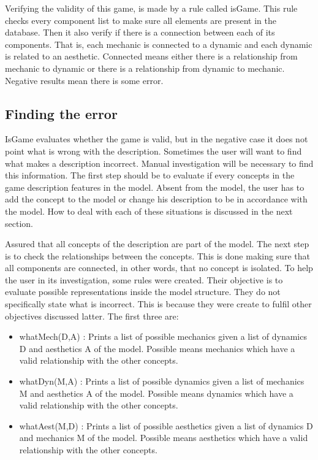 Verifying the validity of this game, is made by a rule called isGame. This rule checks every component list to make sure all elements are present in the database. Then it also verify if there is a connection between each of its components. That is, each mechanic is connected to a dynamic and each dynamic is related to an aesthetic. Connected means either there is a relationship from mechanic to dynamic or there is a relationship from dynamic to mechanic. Negative results mean there is some error.

\subsection{Finding the error}

IsGame evaluates whether the game is valid, but in the negative case it does not point what is wrong with the description. Sometimes the user will want to find what makes a description incorrect. Manual investigation will be necessary to find this information. The first step should be to evaluate if every concepts in the game description features in the model. Absent from the model, the user has to add the concept to the model or change his description to be in accordance with the model. How to deal with each of these situations is discussed in the next section.

Assured that all concepts of the description are part of the model. The next step is to check the relationships between the concepts. This is done making sure that all components are connected, in other words, that no concept is isolated. To help the user in its investigation, some rules were created. Their objective is to evaluate possible representations inside the model structure. They do not specifically state what is incorrect. This is because they were create to fulfil other objectives discussed latter. The first three are:

\begin{itemize}
    \item whatMech(D,A) : Prints a list of possible mechanics given a list of dynamics D and aesthetics A of the model. Possible means mechanics which have a valid relationship with the other concepts.
    \item whatDyn(M,A) : Prints a list of possible dynamics given a list of mechanics M and aesthetics A of the model. Possible means dynamics which have a valid relationship with the other concepts.
    \item whatAest(M,D) : Prints a list of possible aesthetics given a list of dynamics D and mechanics M of the model. Possible means aesthetics which have a valid relationship with the other concepts.
\end{itemize}

